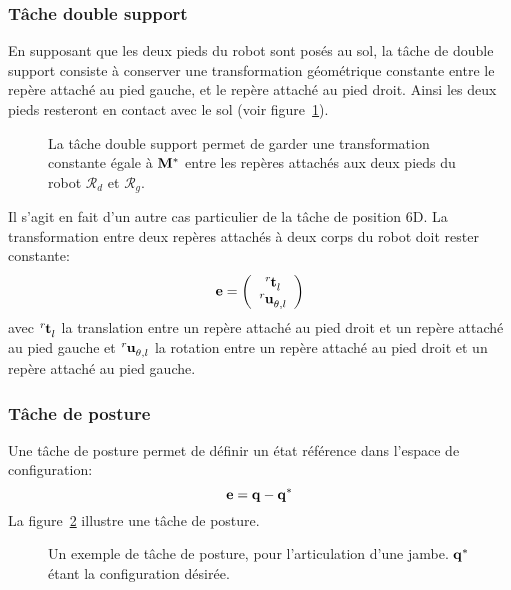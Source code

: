 \subsubsection{T\^ache double support}
En supposant que les deux pieds du robot sont posés au sol,
la t\^ache de double support consiste à conserver une transformation géométrique
constante entre le repère attaché au pied gauche, et le repère attaché au pied droit.
Ainsi les deux pieds resteront en contact avec le sol (voir figure~\ref{fig:doubleSupport}).
\begin{figure}[t]
  \begin{center}
    \resizebox{0.4\textwidth}{!}{
    
    }
  \end{center}
  \caption[T\^ache de double support]{La t\^ache double support permet de garder une transformation constante
  égale à ${\mathbf{M}}^*$ entre les repères attachés aux deux pieds du robot $\mathcal{R}_d$ et $\mathcal{R}_g$.}
  \label{fig:doubleSupport}
\end{figure}
Il s'agit en fait d'un autre cas particulier de la t\^ache de position 6D. 
La transformation entre deux repères attachés
à deux corps du robot doit rester constante:
\begin{equation}
\mbf{e} = \left( \begin{array}{c} \tensor[^{r}]{\mbf{t}}{_{l}} \\ \tensor[^{r}]{\mbf{u}}{_{\theta, l}} \end{array} \right)
\label{eq:taskRelative}
\end{equation}
\noindent avec $\tensor[^{r}]{\mbf{t}}{_{l}}$ la translation entre un repère attaché
au pied droit et un repère attaché au pied gauche et $\tensor[^{r}]{\mbf{u}}{_{\theta, l}}$
la rotation entre un repère attaché au pied droit et un repère attaché au pied gauche.

\subsubsection{T\^ache de posture}
Une t\^ache de posture permet de définir un état référence dans l'espace de configuration:
\begin{equation}
  \mbf{e} = \mbf{q} - \mbf{q}^*
  \label{eq:postureTask}
\end{equation}
La figure~\ref{fig:posture} illustre une t\^ache de posture.
\begin{figure}[t]
  \begin{center}
    \resizebox{0.3\textwidth}{!}{
    
    }
  \end{center}
  \caption[T\^ache de posture]{Un exemple de t\^ache de posture, pour l'articulation d'une jambe. ${\mathbf{q}}^*$ étant la 
  configuration désirée.}
  \label{fig:posture}
\end{figure}

